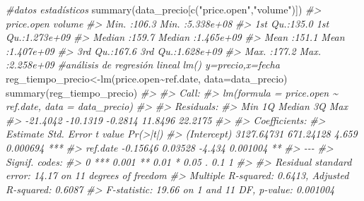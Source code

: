 \documentclass[
]{book}
\newenvironment{Shaded}{\begin{snugshade}}{\end{snugshade}}
\newcommand{\AttributeTok}[1]{\textcolor[rgb]{0.77,0.63,0.00}{#1}}
\newcommand{\CommentTok}[1]{\textcolor[rgb]{0.56,0.35,0.01}{\textit{#1}}}
\newcommand{\FunctionTok}[1]{\textcolor[rgb]{0.00,0.00,0.00}{#1}}
\newcommand{\NormalTok}[1]{#1}
\newcommand{\OtherTok}[1]{\textcolor[rgb]{0.56,0.35,0.01}{#1}}
\newcommand{\SpecialCharTok}[1]{\textcolor[rgb]{0.00,0.00,0.00}{#1}}
\newcommand{\StringTok}[1]{\textcolor[rgb]{0.31,0.60,0.02}{#1}}
\begin{document}
\begin{Shaded}
\begin{Highlighting}[]
\CommentTok{\#datos estadísticos}
\FunctionTok{summary}\NormalTok{(data\_precio[}\FunctionTok{c}\NormalTok{(}\StringTok{"price.open"}\NormalTok{,}\StringTok{"volume"}\NormalTok{)])}
\CommentTok{\#\textgreater{}    price.open        volume         }
\CommentTok{\#\textgreater{}  Min.   :106.3   Min.   :5.338e+08  }
\CommentTok{\#\textgreater{}  1st Qu.:135.0   1st Qu.:1.273e+09  }
\CommentTok{\#\textgreater{}  Median :159.7   Median :1.465e+09  }
\CommentTok{\#\textgreater{}  Mean   :151.1   Mean   :1.407e+09  }
\CommentTok{\#\textgreater{}  3rd Qu.:167.6   3rd Qu.:1.628e+09  }
\CommentTok{\#\textgreater{}  Max.   :177.2   Max.   :2.258e+09}
\CommentTok{\#análisis de regresión lineal lm() y=precio,x=fecha}
\NormalTok{reg\_tiempo\_precio}\OtherTok{\textless{}{-}}\FunctionTok{lm}\NormalTok{(price.open}\SpecialCharTok{\textasciitilde{}}\NormalTok{ref.date, }\AttributeTok{data=}\NormalTok{data\_precio)}
\FunctionTok{summary}\NormalTok{(reg\_tiempo\_precio)}
\CommentTok{\#\textgreater{} }
\CommentTok{\#\textgreater{} Call:}
\CommentTok{\#\textgreater{} lm(formula = price.open \textasciitilde{} ref.date, data = data\_precio)}
\CommentTok{\#\textgreater{} }
\CommentTok{\#\textgreater{} Residuals:}
\CommentTok{\#\textgreater{}      Min       1Q   Median       3Q      Max }
\CommentTok{\#\textgreater{} {-}21.4042 {-}10.1319  {-}0.2814  11.8496  22.2175 }
\CommentTok{\#\textgreater{} }
\CommentTok{\#\textgreater{} Coefficients:}
\CommentTok{\#\textgreater{}               Estimate Std. Error t value Pr(\textgreater{}|t|)    }
\CommentTok{\#\textgreater{} (Intercept) 3127.64731  671.24128   4.659 0.000694 ***}
\CommentTok{\#\textgreater{} ref.date      {-}0.15646    0.03528  {-}4.434 0.001004 ** }
\CommentTok{\#\textgreater{} {-}{-}{-}}
\CommentTok{\#\textgreater{} Signif. codes:  }
\CommentTok{\#\textgreater{} 0 \textquotesingle{}***\textquotesingle{} 0.001 \textquotesingle{}**\textquotesingle{} 0.01 \textquotesingle{}*\textquotesingle{} 0.05 \textquotesingle{}.\textquotesingle{} 0.1 \textquotesingle{} \textquotesingle{} 1}
\CommentTok{\#\textgreater{} }
\CommentTok{\#\textgreater{} Residual standard error: 14.17 on 11 degrees of freedom}
\CommentTok{\#\textgreater{} Multiple R{-}squared:  0.6413, Adjusted R{-}squared:  0.6087 }
\CommentTok{\#\textgreater{} F{-}statistic: 19.66 on 1 and 11 DF,  p{-}value: 0.001004}


\end{Highlighting}
\end{Shaded}
\end{document}
